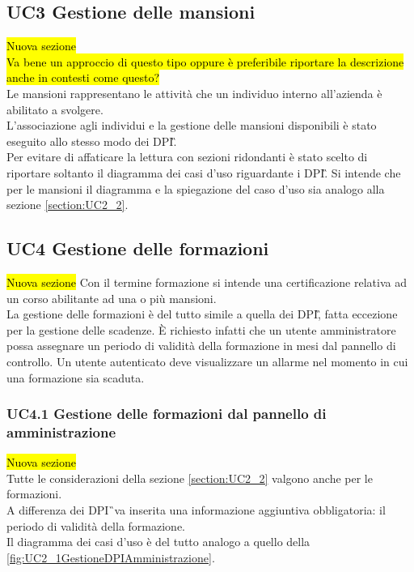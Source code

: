 	\newpage		
	\subsection{UC3 Gestione  delle mansioni}
		\label{section:UC3}
		\hl{Nuova sezione}\\
		\hl{Va bene un approccio di questo tipo oppure è preferibile riportare la descrizione anche in contesti come questo?}\\
		Le mansioni rappresentano le attività che un individuo interno all'azienda è abilitato a svolgere.\\
		L'associazione agli individui e la gestione delle mansioni disponibili è stato eseguito allo stesso modo dei \gls{DPI}\G. \\
		Per evitare di affaticare la lettura con sezioni ridondanti è stato scelto di riportare soltanto il diagramma dei casi d'uso riguardante i \gls{DPI}\G. Si intende che per le mansioni il diagramma e la spiegazione del caso d'uso sia analogo alla sezione \ref{section:UC2_2}.
	
	\newpage 
	\subsection{UC4 Gestione delle formazioni}
		\label{section:UC4}
		\hl{Nuova sezione}
		Con il termine formazione si intende una certificazione relativa ad un corso abilitante ad una o più mansioni.\\
		La gestione delle formazioni è del tutto simile a quella dei \gls{DPI}\G, fatta eccezione per la gestione delle scadenze. È richiesto infatti che un utente amministratore possa assegnare un periodo di validità della formazione in mesi dal pannello di controllo. Un utente autenticato deve visualizzare un allarme nel momento in cui una formazione sia scaduta.
		
	\subsubsection{UC4.1 Gestione delle formazioni dal pannello di amministrazione }

		\hl{Nuova sezione}\\
		Tutte le considerazioni della sezione \ref{section:UC2_2} valgono anche per le formazioni. \\
		A differenza dei \gls{DPI}\G\ va inserita una informazione aggiuntiva obbligatoria: il periodo di validità della formazione. \\
		Il diagramma dei casi d'uso è del tutto analogo a quello della  \autoref{fig:UC2_1GestioneDPIAmministrazione}.
	
